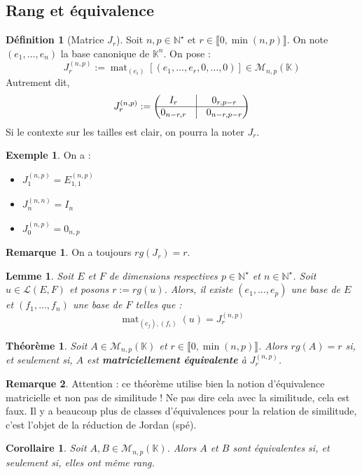 \documentclass[french]{book}
\newcommand{\N}{\mathbb{N}}
\newcommand{\K}{\mathbb{K}}
\newcommand{\st}{^\star}
\theoremstyle{plain}
\newtheorem{thm}{Théorème}[chapter]
\newtheorem{lem}{Lemme}[chapter]
\newtheorem{cor}{Corollaire}[chapter]
\theoremstyle{definition}
\newtheorem{dfn}{Définition}[chapter]
\newtheorem{exa}{Exemple}[chapter]
\newtheorem{rmq}{Remarque}[chapter]
\theoremstyle{remark}
\DeclareMathOperator{\mat}{mat}
\begin{document}
\subsection{Rang et équivalence}
\begin{dfn}[Matrice $J_r$]
	Soit $n,p\in\N\st$ et $r\in\llbracket0,\min(n,p)\rrbracket$. On note $(e_1,\ldots,e_n)$ la base canonique de $\K^n$. On pose : $$J_r^{(n,p)}:=\mat_{(e_i)}\left[\left(e_1,\ldots,e_r,0,\ldots,0\right)\right]\in\mathcal{M}_{n,p}(\K)$$ Autrement dit, $$J_r^{(n,p)}:=\begin{pmatrix}I_r&\vline&0_{r,p-r}\\ \hline 0_{n-r,r}&\vline&0_{n-r,p-r}\end{pmatrix}$$ Si le contexte sur les tailles est clair, on pourra la noter $J_r$.
\end{dfn}
\begin{exa}
	On a : \begin{itemize}
		\item $J_1^{(n,p)}=E_{1,1}^{(n,p)}$
		\item $J_n^{(n,n)}=I_n$
		\item $J_0^{(n,p)}=0_{n,p}$
	\end{itemize}
\end{exa}
\begin{rmq}
	On a toujours $rg(J_r)=r$.
\end{rmq}
\begin{lem}
	Soit $E$ et $F$ de dimensions respectives $p\in\N\st$ et $n\in\N\st$. Soit $u\in\mathcal{L}(E,F)$ et posons $r:=rg(u)$. Alors, il existe $(e_1,\ldots,e_p)$ une base de $E$ et $(f_1,\ldots,f_n)$ une base de $F$ telles que : $$\mat_{(e_j),(f_i)}(u)=J_r^{(n,p)}$$
\end{lem}
\begin{thm}
	Soit $A\in\mathcal{M}_{n,p}(\K)$ et $r\in\llbracket0,\min(n,p)\rrbracket$. Alors $rg(A)=r$ si, et seulement si, $A$ est \textbf{matriciellement équivalente} à $J_r^{(n,p)}$.
\end{thm}
\begin{rmq}
	Attention : ce théorème utilise bien la notion d'équivalence matricielle et non pas de similitude ! Ne pas dire cela avec la similitude, cela est faux. Il y a beaucoup plus de classes d'équivalences pour la relation de similitude, c'est l'objet de la réduction de Jordan (spé).
\end{rmq}
\begin{cor}
	Soit $A,B\in\mathcal{M}_{n,p}(\K)$. Alors $A$ et $B$ sont équivalentes si, et seulement si, elles ont même rang.
\end{cor}
\end{document}
